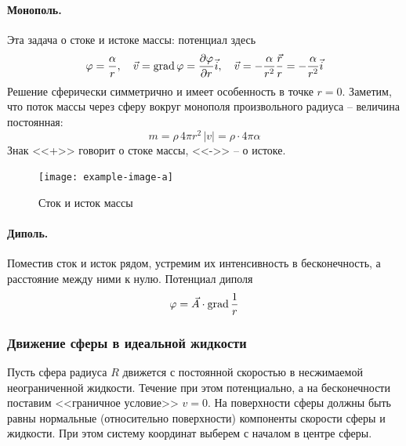 \paragraph{Монополь.} Эта задача о стоке и истоке массы: потенциал здесь
\begin{equation}
    \varphi = \frac{\alpha}{r}, \quad \vec{v} = \operatorname{grad} \varphi = \pdv{\varphi}{r} \vec{i}, \quad \vec{v} = -\frac{\alpha}{r^2}  \frac{\vec{r}}{r} = 
    -\frac{\alpha}{r^2} \vec{i}
\end{equation}
Решение сферически симметрично и имеет особенность в точке $r=0$. Заметим, что поток массы через сферу вокруг монополя произвольного радиуса -- величина постоянная:
\begin{equation}
    m = \rho\, 4\pi r^2\, |v| = \rho\cdot 4\pi\alpha
\end{equation}
Знак <<+>> говорит о стоке массы, <<->> -- о истоке.
\begin{figure}[H]
    \centering
    \texttt{[image: example-image-a]}
    \caption{Сток и исток массы}
    \label{fig:stokistok}
\end{figure}

\paragraph{Диполь.} Поместив сток и исток рядом, устремим их интенсивность в бесконечность, а расстояние между ними к нулю. Потенциал диполя
\begin{equation}
    \varphi = \vec{A} \cdot \operatorname{grad} \frac{1}{r}
\end{equation}

\subsubsection{Движение сферы в идеальной жидкости}
Пусть сфера радиуса $R$ движется с постоянной скоростью в несжимаемой 
неограниченной жидкости. Течение при этом потенциально, а на бесконечности поставим <<граничное условие>> $v=0$. На поверхности сферы должны быть равны нормальные (относительно поверхности) компоненты скорости сферы и жидкости. При этом систему координат выберем с началом в центре сферы. 

